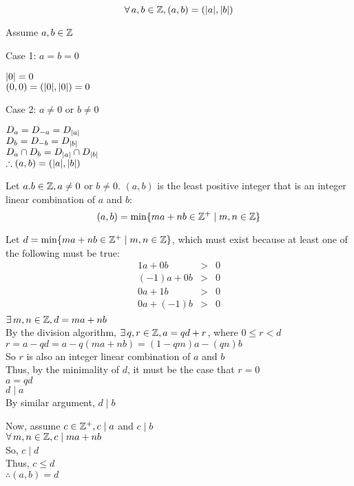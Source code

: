 \documentclass[letterpaper,12pt,fleqn]{article}
\begin{document}
\begin{theorem}
  \listbreak
  \[\forall\,a,b\in\mathbb{Z},(a,b)=(\lvert a\rvert,\lvert b\rvert)\]
\end{theorem}

\begin{theproof}
  Assume $a,b\in\mathbb{Z}$

  \begin{description}
  \item {Case 1: $a=b=0$}

    $\lvert0\rvert=0$ \\
    $(0,0)=(\lvert0\rvert,\lvert0\rvert)=0$

  \item {Case 2: $a\ne0$ or $b\ne0$}

    $D_a=D_{-a}=D_{\lvert a\rvert}$ \\
    $D_b=D_{-b}=D_{\lvert b\rvert}$ \\
    $D_a\cap D_b=D_{\lvert a\rvert}\cap D_{\lvert b\rvert}$ \\
    $\therefore (a,b)=(\lvert a\rvert,\lvert b\rvert)$
  \end{description}
\end{theproof}

\begin{theorem}
  Let $a.b\in\mathbb{Z},a\ne0$ or $b\ne0$. $(a,b)$ is the least positive integer that
  is an integer linear combination of $a$ and $b$:
  \[(a,b)=\min\{ma+nb\in\mathbb{Z}^+\mid m,n\in\mathbb{Z}\}\]
\end{theorem}

\begin{theproof}
  Let $d=\min\{ma+nb\in\mathbb{Z}^+\mid m,n\in\mathbb{Z}\}$, which must exist because at least
  one of the following must be true:
  \begin{eqnarray*}
  1a+0b &>& 0 \\
  (-1)a+0b &>& 0 \\
  0a+1b &>& 0 \\
  0a+(-1)b &>& 0 \\
  \end{eqnarray*}
  $\exists\,m,n\in\mathbb{Z},d=ma+nb$ \\
  By the division algorithm, $\exists\,q,r\in\mathbb{Z},a=qd+r$, where $0\le r<d$ \\
  $r=a-qd=a-q(ma+nb)=(1-qm)a-(qn)b$ \\
  So $r$ is also an integer linear combination of $a$ and $b$ \\
  Thus, by the minimality of $d$, it must be the case that $r=0$ \\
  $a=qd$ \\
  $d\mid a$ \\
  By similar argument, $d\mid b$

  Now, assume $c\in\mathbb{Z}^+,c\mid a$ and $c\mid b$ \\
  $\forall\,m,n\in\mathbb{Z},c\mid ma+nb$ \\
  So, $c\mid d$ \\
  Thus, $c\le d$ \\
  $\therefore (a,b)=d$
\end{theproof}
\end{document}
